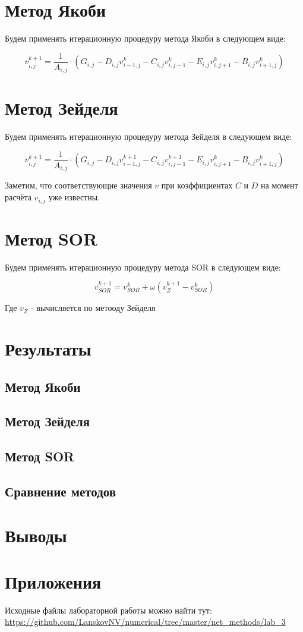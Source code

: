 \documentclass[12pt]{article}
\begin{document}
\section{Метод Якоби}

Будем применять итерационную процедуру метода Якоби в следующем виде:

\begin{equation}
v_{i,j}^{k+1} = \dfrac{1}{A_{i,j}} \cdot (G_{i,j} - D_{i,j}v_{i-1,j}^{k} - C_{i,j}v_{i,j-1}^{k} - E_{i,j}v_{i,j+1}^{k} - B_{i,j}v_{i+1,j}^{k})
\end{equation}

\section{Метод Зейделя}

Будем применять итерационную процедуру метода Зейделя в следующем виде:

\begin{equation}
v_{i,j}^{k+1} = \dfrac{1}{A_{i,j}} \cdot (G_{i,j} - D_{i,j}v_{i-1,j}^{k+1} - C_{i,j}v_{i,j-1}^{k+1} - E_{i,j}v_{i,j+1}^{k} - B_{i,j}v_{i+1,j}^{k})
\end{equation}

Заметим, что соответствующие значения $v$ при коэффициентах $C$ и $D$ на момент расчёта $v_{i,j}$ уже известны.

\section{Метод SOR}

Будем применять итерационную процедуру метода SOR в следующем виде:

\begin{equation}
v_{SOR}^{k+1} = v_{SOR}^{k} + \omega (v_{Z}^{k+1} - v_{SOR}^{k})
\end{equation}

Где $v_{Z}$ - вычисляется по метооду Зейделя

\section{Результаты}
\subsection{Метод Якоби}
\subsection{Метод Зейделя}
\subsection{Метод SOR}
\subsection{Сравнение методов}
\section{Выводы}
\section{Приложения}
Исходные файлы лабораторной работы можно найти тут: \\
\url{https://github.com/LanskovNV/numerical/tree/master/net_methods/lab_3}
\end{document}
